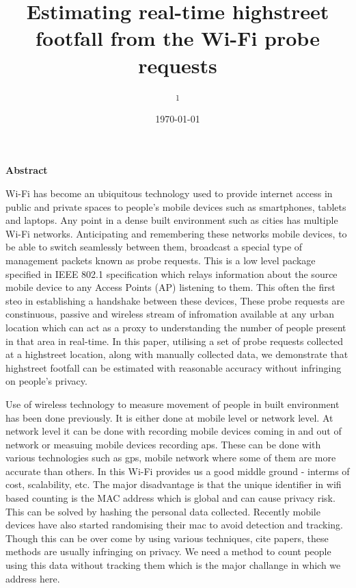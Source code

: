 \documentclass[11t, a4paper, twocolumn]{article}
\title{Estimating real-time highstreet footfall from the Wi-Fi probe requests}
\author{
	\authorstyle{
		Balamurugan Soundararaj\textsuperscript{1}, 
		James Cheshire\textsuperscript{1} and 
		Paul Longley\textsuperscript{1}}
	\newline\newline
	\textsuperscript{1}\institution{
		Department of Geography, 
		University College London, 
		United Kingdom}
}
\date{\today}
\begin{document}

	\maketitle
	\thispagestyle{firstpage}

	\textbf{Abstract}

	Wi-Fi has become an ubiquitous technology used to provide internet access in
	public and private spaces to people's mobile devices such as smartphones, 
	tablets and laptops. Any point in a dense built environment such as cities 
	has multiple Wi-Fi networks. Anticipating and remembering these networks
	mobile devices, to be able to switch seamlessly between them,
	broadcast a special type of management packets known as probe requests.
	This is a low level package specified in IEEE 802.1 specification
	which relays information about the source mobile device to
	any Access Points (AP) listening to them.
	This often the first steo in establishing a handshake between these devices,
	These probe requests are constinuous, passive and wireless stream of
	infromation available at any urban location which can act as a proxy to
	understanding the number of people present in that area in real-time.
	In this paper, utilising a set of probe requests collected
	at a highstreet location, along with manually collected data, we demonstrate
	that highstreet footfall can be estimated with reasonable accuracy without
	infringing on people's privacy.

	Use of wireless technology to measure movement of people in built
	environment has been done previously. It is either done at mobile
	level or network level.
	At network level it can be done with recording mobile devices coming in
	and out of network or measuing mobile devices recording aps.
	These can be done with various technologies such as gps, mobile network
	where some of them are more accurate than others.
	In this Wi-Fi provides us a good middle ground - interms of cost,
	scalability,  etc. The major disadvantage is that the unique identifier
	in wifi based counting is the MAC address which is global and can 
	cause privacy risk. This can be solved by hashing the personal data
	collected. Recently mobile devices have also started randomising their
	mac to avoid detection and tracking.
	Though this can be over come by using various techniques, cite papers,
	these methods are usually infringing on privacy.
	We need a method to count people using this data without tracking them
	which is the major challange in which we address here.
\end{document}
